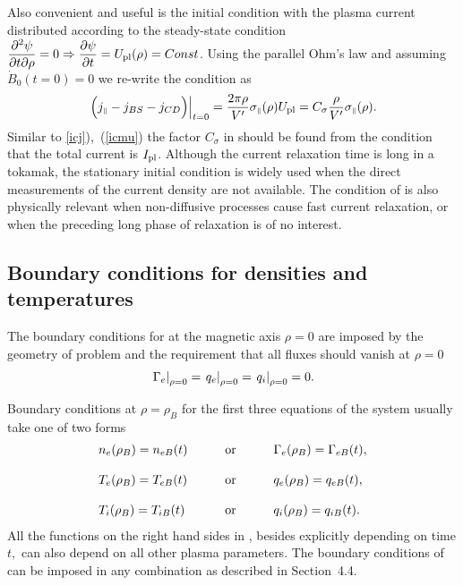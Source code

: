 Also convenient and useful is the initial condition with the plasma
current distributed according to the steady-state condition 
$\displaystyle{\partial^2 \psi\over\partial t\partial \rho}=0\Rightarrow\displaystyle{\partial \psi\over\partial t}
=U_{\rm pl}(\rho)=Const$. 
Using the parallel Ohm's law  and assuming
$\dot B_0(t=0)=0$ we re-write the condition as 
\begin{equation}\label{icU}
\left.\Bigl(j_{\scriptscriptstyle\parallel}-j_{BS}-j_{CD}\Bigr)\right|_{t=0}
=\frac{2\pi\rho}{V'}\sigma_{\scriptscriptstyle\parallel}(\rho)U_{\rm pl}
=C_\sigma\frac{\rho}{V'}\sigma_{\scriptscriptstyle\parallel}(\rho)
.\end{equation}
Similar to \eqs\ref{icj}),~(\ref{icmu}) the factor $C_\sigma$ in
 should be found from the condition that the total current is
$I_{\rm pl}$. 
Although the current relaxation time is long in a tokamak, the
stationary initial condition  is widely used when the direct
measurements of the current density are not available. 
The condition of  is also physically relevant when
non-diffusive processes cause fast current relaxation, or when the 
preceding long phase of relaxation is of no interest. 

\subsection{Boundary conditions for densities and temperatures}

The boundary conditions for  at the magnetic axis $\rho=0$ are
imposed by the geometry of problem and the requirement that all fluxes
should vanish at $\rho=0$ 
\begin{equation}\label{bc0}
\left.\Gamma_e\right|_{\rho=0}
=\left.q_e\right|_{\rho=0}
=\left.q_i\right|_{\rho=0}
=0
.\end{equation}

Boundary conditions at $\rho=\rho_B$ for the first three equations of
the system  usually take one of two forms 
\begin{equation}\label{bc}
\begin{array}{ll}
n_e(\rho_B)=n_{eB}(t)
\qquad &\mbox{or}\Quad
\Gamma_e(\rho_B)=\Gamma_{eB}(t)
,\bigskip\\
T_e(\rho_B)=T_{eB}(t)
\qquad &\mbox{or}\Quad
q_e(\rho_B)=q_{eB}(t)
,\bigskip\\
T_i(\rho_B)=T_{iB}(t)
\qquad &\mbox{or}\Quad
q_i(\rho_B)=q_{iB}(t)
.\end{array}
\end{equation}
All the functions on the right hand sides in , besides
explicitly depending on time $t,$ can also depend on all other plasma
parameters. 
The boundary conditions of  can be imposed in any combination as
described in Section~4.4.


